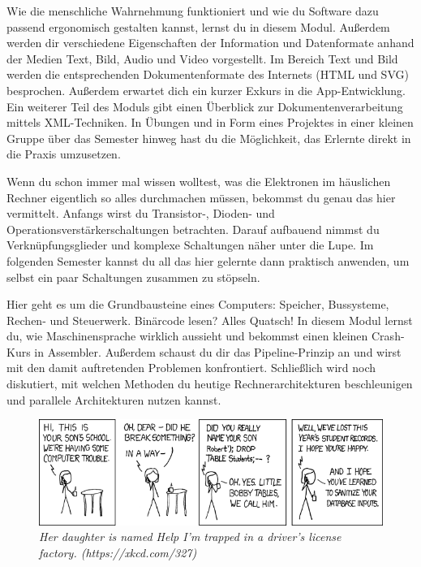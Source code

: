 \newpage

Wie die menschliche Wahrnehmung funktioniert und wie du Software dazu passend ergonomisch gestalten kannst, lernst du in diesem Modul.
Außerdem werden dir verschiedene Eigenschaften der Information und Datenformate anhand der Medien Text, Bild, Audio und Video vorgestellt.
Im Bereich Text und Bild werden die entsprechenden Dokumentenformate des Internets (HTML und SVG) besprochen.
Außerdem erwartet dich ein kurzer Exkurs in die App-Entwicklung.
Ein weiterer Teil des Moduls gibt einen Überblick zur Dokumentenverarbeitung mittels XML-Techniken.
In Übungen und in Form eines Projektes in einer kleinen Gruppe über das Semester hinweg hast du die Möglichkeit, das Erlernte direkt in die Praxis umzusetzen.

Wenn du schon immer mal wissen wolltest, was die Elektronen im häuslichen Rechner eigentlich so alles durchmachen müssen, bekommst du genau das hier vermittelt.
Anfangs wirst du Transistor-, Dioden- und Operationsverstärkerschaltungen betrachten.
Darauf aufbauend nimmst du Verknüpfungsglieder und komplexe Schaltungen näher unter die Lupe.
Im folgenden Semester kannst du all das hier gelernte dann praktisch anwenden, um selbst ein paar Schaltungen zusammen zu stöpseln.

Hier geht es um die Grundbausteine eines Computers:
Speicher, Bussysteme, Rechen- und Steuerwerk.
Binärcode lesen? Alles Quatsch! In diesem Modul lernst du, wie Maschinensprache wirklich aussieht und bekommst einen kleinen Crash-Kurs in Assembler.
Außerdem schaust du dir das Pipeline-Prinzip an und wirst mit den damit auftretenden Problemen konfrontiert.
Schließlich wird noch diskutiert, mit welchen Methoden du heutige Rechnerarchitekturen beschleunigen und parallele Architekturen nutzen kannst.

\vfill

\begin{figure}[h!]
\centering
\includegraphics[scale=.5]{img/xkcd/exploits_of_a_mom.png}
\caption*{{\small \textit{Her daughter is named Help I'm trapped in a driver's license factory. (https://xkcd.com/327)}}}
\end{figure}

